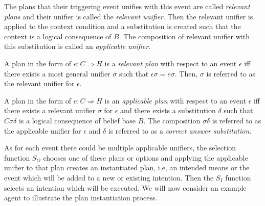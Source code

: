 The plans that their triggering event unifies with this event are called \textit{relevant plans} and their unifier is called the \textit{relevant unifier}. Then the relevant unifier is applied to the context condition and a substitution is created such that the context is a logical consequence of $B$. The composition of relevant unifier with this substitution is called an \textit{applicable unifier}. 

\begin{definition}
 A plan in the form of $e : C \Rightarrow H$ is a \textit{relevant plan} with respect to an event $\epsilon$ iff there exists a most general unifier $\sigma$ such that $\epsilon\sigma = e\sigma$. Then, $\sigma$ is referred to as the relevant unifier for $\epsilon$.
\end{definition}

\begin{definition}
 A plan in the form of $e : C \Rightarrow H$ is an \textit{applicable plan} with respect to an event $\epsilon$ iff there exists a relevant unifier $\sigma$ for $\epsilon$ and there exists a substitution $\delta$ such that $C\sigma\delta$
is a logical consequence of belief base $B$. The composition $\sigma\delta$ is referred to as the applicable unifier for $\epsilon$ and $\delta$ is referred to as a \textit{correct answer substitution}.
\end{definition}


As for each event there could be multiple applicable unifiers, the selection function $S_O$ chooses one of these plans or options and applying the applicable unifier to that plan creates an instantiated plan, i.e, an intended means or the event which will be added to a new or existing intention. Then the $S_I$ function selects an intention which will be executed. We will now consider an example agent to illustrate the plan instantiation process.










